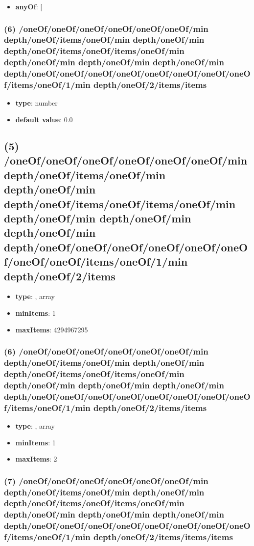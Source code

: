 \begin{itemize}[leftmargin=6em]\item {\bf anyOf}: [\end{itemize}\subsubsection{(6) /oneOf/oneOf/oneOf/oneOf/oneOf/oneOf/min depth/oneOf/items/oneOf/min depth/oneOf/min depth/oneOf/items/oneOf/items/oneOf/min depth/oneOf/min depth/oneOf/min depth/oneOf/min depth/oneOf/oneOf/oneOf/oneOf/oneOf/oneOf/oneOf/oneOf/items/oneOf/1/min depth/oneOf/2/items/items}
\begin{itemize}[leftmargin=6em]\item {\bf type}: number\item {\bf default value}: 0.0
\end{itemize}\subsection{(5) /oneOf/oneOf/oneOf/oneOf/oneOf/oneOf/min depth/oneOf/items/oneOf/min depth/oneOf/min depth/oneOf/items/oneOf/items/oneOf/min depth/oneOf/min depth/oneOf/min depth/oneOf/min depth/oneOf/oneOf/oneOf/oneOf/oneOf/oneOf/oneOf/oneOf/items/oneOf/1/min depth/oneOf/2/items}
\begin{itemize}[leftmargin=5em]\item {\bf type}: , array\item {\bf minItems}: 1
\item {\bf maxItems}: 4294967295
\end{itemize}\subsubsection{(6) /oneOf/oneOf/oneOf/oneOf/oneOf/oneOf/min depth/oneOf/items/oneOf/min depth/oneOf/min depth/oneOf/items/oneOf/items/oneOf/min depth/oneOf/min depth/oneOf/min depth/oneOf/min depth/oneOf/oneOf/oneOf/oneOf/oneOf/oneOf/oneOf/oneOf/items/oneOf/1/min depth/oneOf/2/items/items}
\begin{itemize}[leftmargin=6em]\item {\bf type}: , array\item {\bf minItems}: 1
\item {\bf maxItems}: 2
\end{itemize}\subsubsection{(7) /oneOf/oneOf/oneOf/oneOf/oneOf/oneOf/min depth/oneOf/items/oneOf/min depth/oneOf/min depth/oneOf/items/oneOf/items/oneOf/min depth/oneOf/min depth/oneOf/min depth/oneOf/min depth/oneOf/oneOf/oneOf/oneOf/oneOf/oneOf/oneOf/oneOf/items/oneOf/1/min depth/oneOf/2/items/items/items}
